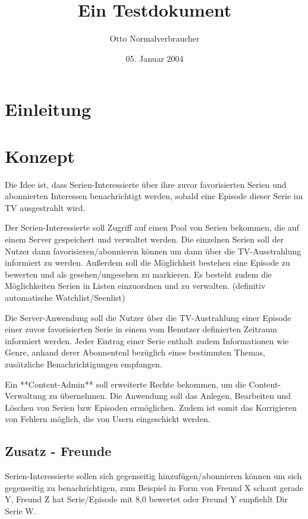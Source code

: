 \documentclass[a4paper]{article}
\title{Ein Testdokument}
\author{Otto Normalverbraucher}
\date{05. Januar 2004}
\begin{document}
\maketitle

\newpage

\tableofcontents

\newpage


\section{Einleitung}

\section{Konzept}

Die Idee ist, dass Serien-Interessierte über ihre zuvor favorisierten Serien und abonnierten Interessen benachrichtigt werden, sobald eine Episode dieser Serie im TV ausgestrahlt wird.

Der Serien-Interessierte soll Zugriff auf einen Pool von Serien bekommen, die auf einem Server gespeichert und verwaltet werden.
Die einzelnen Serien soll der Nutzer dann favorisieren/abonnieren können um dann über die TV-Ausstrahlung informiert zu werden.
Außerdem soll die Möglichkeit bestehen eine Episode zu bewerten und als gesehen/ungesehen zu markieren. Es besteht zudem die Möglichkeiten Serien in Listen einzuordnen und zu verwalten. (definitiv automatische Watchlist/Seenlist)

Die Server-Anwendung soll die Nutzer über die TV-Austrahlung einer Episode einer zuvor favorisierten Serie in einem vom Benutzer definierten Zeitraum informiert werden. Jeder Eintrag einer Serie enthalt zudem Informationen wie Genre, anhand derer Abonnentenl bezüglich eines bestimmten Themas, zusätzliche Benachrichtigungen empfangen.

Ein **Content-Admin** soll erweiterte Rechte bekommen, um die Content-Verwaltung zu übernehmen. Die Anwendung soll das Anlegen, Bearbeiten und Löschen von Serien bzw Episoden ermöglichen. Zudem ist somit das Korrigieren von Fehlern möglich, die von Usern eingeschickt werden.

\subsection{Zusatz - Freunde}
Serien-Interessierte sollen sich gegenseitig hinzufügen/abonnieren können um sich gegenseitig zu benachrichtigen, zum Beispiel in Form von Freund X schaut gerade Y, Freund Z hat Serie/Episode mit 8,0 bewertet oder Freund Y empfiehlt Dir Serie W.
\end{document}
